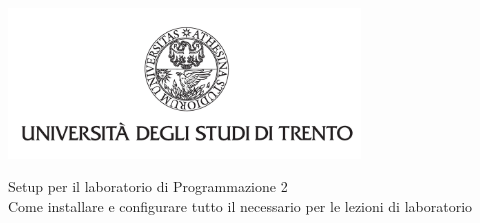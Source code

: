 \begin{titlepage}
	\centering
    \graphicspath{{src/capitoli/01-titolo/img/}}
	\includegraphics[width=0.7\textwidth, keepaspectratio]{logo-unitn.png}

	\vspace{1.3cm}
	\Large{Setup per il laboratorio di Programmazione 2\\}
	\vspace{0.4cm}
	\small{Come installare e configurare tutto il necessario per le lezioni di laboratorio}
\end{titlepage}
